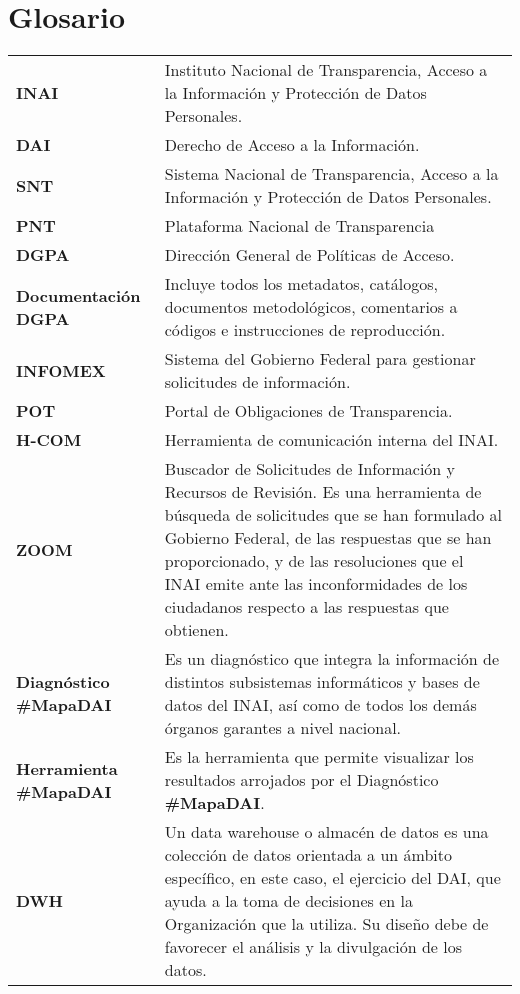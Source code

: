 \documentclass[12pt]{book}
\begin{document}
\chapter{Glosario}
\begin{center}
    \begin{longtable}{p{3cm}p{11.5cm}}
\textbf{INAI} & Instituto Nacional de Transparencia, Acceso a la Información y Protección de Datos Personales. \\
\textbf{DAI} & Derecho de Acceso a la Información. \\
\textbf{SNT} & Sistema Nacional de Transparencia, Acceso a la Información y Protección de Datos Personales. \\
\textbf{PNT} & Plataforma Nacional de Transparencia \\
\textbf{DGPA} & Dirección General de Políticas de Acceso. \\
\textbf{Documentación DGPA} & Incluye todos los metadatos, catálogos, documentos metodológicos, comentarios a códigos e instrucciones de reproducción. \\
\textbf{INFOMEX} & Sistema del Gobierno Federal para gestionar solicitudes de información.\\
\textbf{POT} & Portal de Obligaciones de Transparencia.\\
\textbf{H-COM} & Herramienta de comunicación interna del INAI.\\
\textbf{ZOOM} & Buscador de Solicitudes de Información y Recursos de Revisión. Es una herramienta de búsqueda de solicitudes que se han formulado al Gobierno Federal, de las respuestas que se han proporcionado, y de las resoluciones que el INAI emite ante las inconformidades de los ciudadanos respecto a las respuestas que obtienen. \\
\textbf{Diagnóstico \#MapaDAI} & Es un diagnóstico que integra la información de distintos subsistemas informáticos y bases de datos del INAI, así como de todos los demás órganos garantes a nivel nacional. \\
\textbf{Herramienta \#MapaDAI} & Es la herramienta que permite visualizar los resultados arrojados por el Diagnóstico \textbf{ \#MapaDAI}. \\
\textbf{DWH} & Un data warehouse o almacén de datos es una colección de datos orientada a un ámbito específico, en este caso, el ejercicio del DAI, que ayuda a la toma de decisiones en la Organización que la utiliza. Su diseño debe de favorecer el análisis y la divulgación de los datos. \\

\end{longtable}
\end{center}
\end{document}
